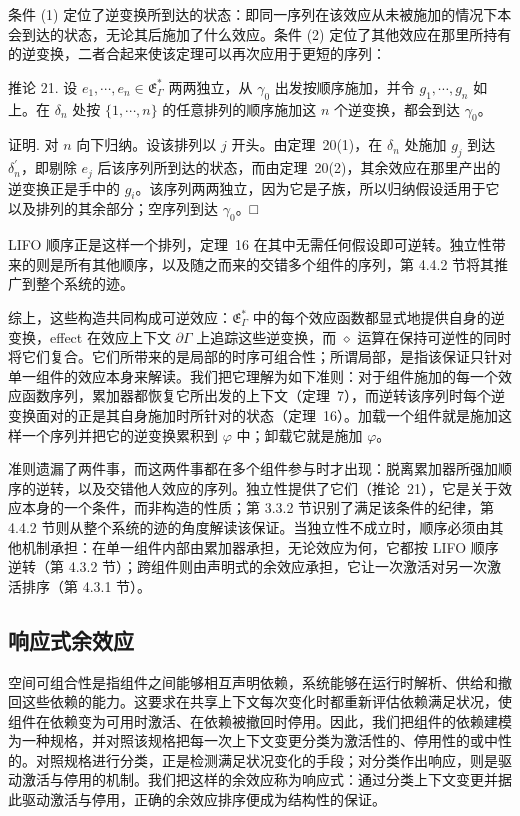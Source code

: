 \documentclass[
  10
]{article}
\begin{document}
条件 (1) 定位了逆变换所到达的状态：即同一序列在该效应从未被施加的情况下本会到达的状态，无论其后施加了什么效应。条件 (2) 定位了其他效应在那里所持有的逆变换，二者合起来使该定理可以再次应用于更短的序列：

推论 21. 设 \(e _ { 1 } , \cdots , e _ { n } \in \mathfrak { E } _ { \Gamma } ^ { * }\) 两两独立，从
\(\gamma _ { 0 }\) 出发按顺序施加，并令 \(g _ { 1 } , \cdots , g _ { n }\) 如上。在 \(\delta _ { n }\) 处按
\(\{ 1 , \cdots , n \}\) 的任意排列的顺序施加这 \(n\) 个逆变换，都会到达 \(\gamma _ { 0 }\)。

证明. 对 \(n\) 向下归纳。设该排列以 \(j\) 开头。由定理~20(1)，在 \(\delta _ { n }\) 处施加 \(g _ { j }\) 到达
\(\delta _ { n } ^ { \prime }\)，即剔除 \(e _ { j }\) 后该序列所到达的状态，而由定理~20(2)，其余效应在那里产出的逆变换正是手中的 \(g _ { i }\)。该序列两两独立，因为它是子族，所以归纳假设适用于它以及排列的其余部分；空序列到达
\(\gamma _ { 0 }\)。□

LIFO 顺序正是这样一个排列，定理~16 在其中无需任何假设即可逆转。独立性带来的则是所有其他顺序，以及随之而来的交错多个组件的序列，第 4.4.2 节将其推广到整个系统的迹。

综上，这些构造共同构成可逆效应：\(\mathfrak { E } _ { \Gamma } ^ { * }\) 中的每个效应函数都显式地提供自身的逆变换，effect 在效应上下文 \(\partial \Gamma\) 上追踪这些逆变换，而 $\diamond$ 运算在保持可逆性的同时将它们复合。它们所带来的是局部的时序可组合性；所谓局部，是指该保证只针对单一组件的效应本身来解读。我们把它理解为如下准则：对于组件施加的每一个效应函数序列，累加器都恢复它所出发的上下文（定理~7），而逆转该序列时每个逆变换面对的正是其自身施加时所针对的状态（定理~16）。加载一个组件就是施加这样一个序列并把它的逆变换累积到 \(\varphi\) 中；卸载它就是施加 \(\varphi\)。

准则遗漏了两件事，而这两件事都在多个组件参与时才出现：脱离累加器所强加顺序的逆转，以及交错他人效应的序列。独立性提供了它们（推论~21），它是关于效应本身的一个条件，而非构造的性质；第 3.3.2 节识别了满足该条件的纪律，第 4.4.2 节则从整个系统的迹的角度解读该保证。当独立性不成立时，顺序必须由其他机制承担：在单一组件内部由累加器承担，无论效应为何，它都按 LIFO 顺序逆转（第 4.3.2 节）；跨组件则由声明式的余效应承担，它让一次激活对另一次激活排序（第 4.3.1 节）。
\subsection{响应式余效应} \label{reactive-coefects}

空间可组合性是指组件之间能够相互声明依赖，系统能够在运行时解析、供给和撤回这些依赖的能力。这要求在共享上下文每次变化时都重新评估依赖满足状况，使组件在依赖变为可用时激活、在依赖被撤回时停用。因此，我们把组件的依赖建模为一种规格，并对照该规格把每一次上下文变更分类为激活性的、停用性的或中性的。对照规格进行分类，正是检测满足状况变化的手段；对分类作出响应，则是驱动激活与停用的机制。我们把这样的余效应称为响应式：通过分类上下文变更并据此驱动激活与停用，正确的余效应排序便成为结构性的保证。
\end{document}
